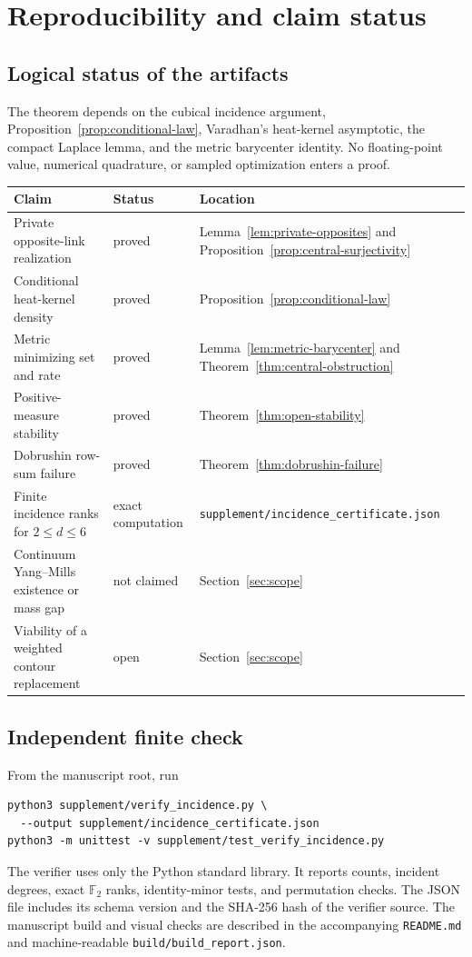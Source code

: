 \section{Reproducibility and claim status}
\label{app:reproducibility}

\subsection{Logical status of the artifacts}

The theorem depends on the cubical incidence argument,
Proposition~\ref{prop:conditional-law}, Varadhan's heat-kernel asymptotic, the
compact Laplace lemma, and the metric barycenter identity.  No floating-point
value, numerical quadrature, or sampled optimization enters a proof.

\begin{center}
\begin{tabular}{@{}p{}p{}p{}@{}}
\toprule
Claim & Status & Location \\
\midrule
Private opposite-link realization & proved &
Lemma~\ref{lem:private-opposites} and Proposition~\ref{prop:central-surjectivity} \\
Conditional heat-kernel density & proved & Proposition~\ref{prop:conditional-law} \\
Metric minimizing set and rate & proved &
Lemma~\ref{lem:metric-barycenter} and Theorem~\ref{thm:central-obstruction} \\
Positive-measure stability & proved & Theorem~\ref{thm:open-stability} \\
Dobrushin row-sum failure & proved & Theorem~\ref{thm:dobrushin-failure} \\
Finite incidence ranks for $2\leq d\leq6$ & exact computation &
\texttt{supplement/incidence\_certificate.json} \\
Continuum Yang--Mills existence or mass gap & not claimed &
Section~\ref{sec:scope} \\
Viability of a weighted contour replacement & open & Section~\ref{sec:scope} \\
\bottomrule
\end{tabular}
\end{center}

\subsection{Independent finite check}

From the manuscript root, run
\begin{verbatim}
python3 supplement/verify_incidence.py \
  --output supplement/incidence_certificate.json
python3 -m unittest -v supplement/test_verify_incidence.py
\end{verbatim}
The verifier uses only the Python standard library.  It reports counts,
incident degrees, exact $\mathbb F_2$ ranks, identity-minor tests, and
permutation checks.  The JSON file includes its schema version and the SHA-256
hash of the verifier source.  The manuscript build and visual checks are
described in the accompanying \texttt{README.md} and machine-readable
\texttt{build/build\_report.json}.

